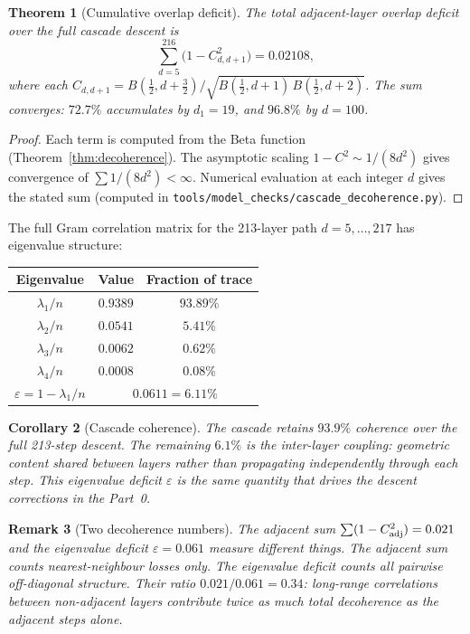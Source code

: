 \documentclass[12pt,a4paper]{article}
\newtheorem{theorem}{Theorem}[section]
\newtheorem{corollary}[theorem]{Corollary}
\newtheorem{remark}[theorem]{Remark}
\begin{document}
\begin{theorem}[Cumulative overlap deficit]\label{thm:cumulative-dec}
The total adjacent-layer overlap deficit over the full cascade descent is
\begin{equation}\label{eq:cum-deficit}
\sum_{d=5}^{216}\bigl(1-C^2_{d,d+1}\bigr) = 0.02108,
\end{equation}
where each $C_{d,d+1} = B(\tfrac{1}{2},d+\tfrac{3}{2})/
\sqrt{B(\tfrac{1}{2},d+1)\,B(\tfrac{1}{2},d+2)}$.
The sum converges: $72.7\%$ accumulates by $d_1=19$, and $96.8\%$ by $d=100$.
\end{theorem}
\begin{proof}
Each term is computed from the Beta function (Theorem~\ref{thm:decoherence}).
The asymptotic scaling $1-C^2\sim 1/(8d^2)$ gives convergence of
$\sum 1/(8d^2)<\infty$. Numerical evaluation at each integer $d$ gives the stated sum
(computed in \texttt{tools/model\_checks/cascade\_decoherence.py}).
\end{proof}

The full Gram correlation matrix for the 213-layer path $d=5,\ldots,217$ has eigenvalue
structure:
\begin{center}
\renewcommand{\arraystretch}{1.2}
\begin{tabular}{ccc}
\toprule
Eigenvalue & Value & Fraction of trace \\
\midrule
$\lambda_1/n$ & $0.9389$ & $93.89\%$ \\
$\lambda_2/n$ & $0.0541$ & $5.41\%$ \\
$\lambda_3/n$ & $0.0062$ & $0.62\%$ \\
$\lambda_4/n$ & $0.0008$ & $0.08\%$ \\
\midrule
$\varepsilon = 1-\lambda_1/n$ & \multicolumn{2}{c}{$0.0611 = 6.11\%$} \\
\bottomrule
\end{tabular}
\end{center}

\begin{corollary}[Cascade coherence]\label{cor:cascade-coherence}
The cascade retains $93.9\%$ coherence over the full 213-step descent. The remaining
$6.1\%$ is the inter-layer coupling: geometric content shared between layers rather than
propagating independently through each step. This eigenvalue deficit $\varepsilon$ is
the same quantity that drives the descent corrections in the Part~0.
\end{corollary}

\begin{remark}[Two decoherence numbers]
The adjacent sum $\sum(1-C^2_{\rm adj}) = 0.021$ and the eigenvalue deficit
$\varepsilon = 0.061$ measure different things. The adjacent sum counts nearest-neighbour
losses only. The eigenvalue deficit counts all pairwise off-diagonal structure. Their ratio
$0.021/0.061 = 0.34$: long-range correlations between non-adjacent layers contribute twice
as much total decoherence as the adjacent steps alone.
\end{remark}
\end{document}
